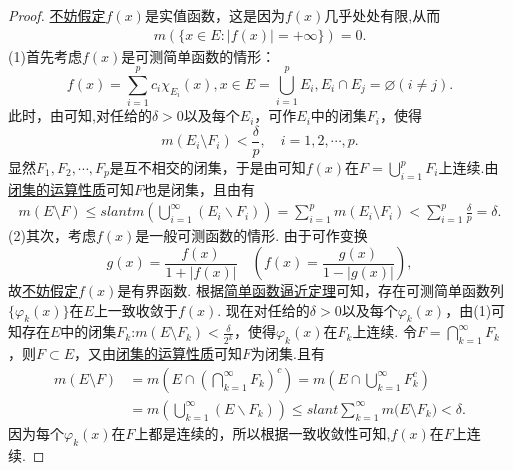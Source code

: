 \documentclass[../../main.tex]{subfiles}
\begin{document}
\begin{proof}
\hyperlink{不妨假定f是实值函数的原因}{不妨假定}\(f(x)\)是实值函数，这是因为$f(x)$几乎处处有限,从而
\begin{align*}
m(\{x \in E: |f(x)| = +\infty\}) = 0.
\end{align*}
(1)首先考虑\(f(x)\)是可测简单函数的情形：
\[f(x) = \sum_{i = 1}^{p} c_{i} \chi_{E_{i}}(x), x \in E = \bigcup_{i = 1}^{p} E_{i}, E_{i} \cap E_{j} = \varnothing (i \neq j).\]
此时，由可知,对任给的\(\delta > 0\)以及每个\(E_{i}\)，可作\(E_{i}\)中的闭集\(F_{i}\)，使得
\[m(E_{i} \setminus F_{i}) < \frac{\delta}{p}, \quad i = 1,2,\cdots,p.\]
显然\(F_{1},F_{2},\cdots,F_{p}\)是互不相交的闭集，于是由可知\(f(x)\)在\(F = \bigcup_{i = 1}^{p} F_{i}\)上连续.由\hyperref[theorem:闭集的运算性质]{闭集的运算性质}可知\(F\)也是闭集，且由有
\begin{align*}
m(E \setminus F) \leqslant slant m(\bigcup_{i=1}^{\infty}(E_i\backslash F_i))=\sum_{i = 1}^{p} m(E_{i} \setminus F_{i}) < \sum_{i = 1}^{p} \frac{\delta}{p} = \delta.
\end{align*}
(2)其次，考虑\(f(x)\)是一般可测函数的情形. 由于可作变换
\[g(x) = \frac{f(x)}{1 + |f(x)|} \quad \left(f(x) = \frac{g(x)}{1 - |g(x)|}\right),\]
故\hyperlink{不妨设f有界的原因}{不妨假定}\(f(x)\)是有界函数. 根据\hyperref[theorem:简单函数逼近定理]{简单函数逼近定理}可知，存在可测简单函数列\(\{\varphi_{k}(x)\}\)在\(E\)上一致收敛于\(f(x)\). 现在对任给的\(\delta > 0\)以及每个\(\varphi_{k}(x)\)，由(1)可知存在\(E\)中的闭集\(F_{k}\):\(m(E \setminus F_{k}) < \frac{\delta}{2^{k}}\)，使得\(\varphi_{k}(x)\)在\(F_{k}\)上连续. 令\(F = \bigcap_{k = 1}^{\infty} F_{k}\)，则\(F \subset E\)，又由\hyperref[theorem:闭集的运算性质]{闭集的运算性质}可知$F$为闭集.且有
\begin{align*}
m(E\setminus F)&=m(E\cap \left( \bigcap_{k=1}^{\infty}{F_k} \right) ^c)=m(E\cap \bigcup_{k=1}^{\infty}{F_{k}^{c}})
\\
&=m(\bigcup_{k=1}^{\infty}{\left( E\backslash F_k \right)})\leqslant slant \sum_{k=1}^{\infty}{m(E}\setminus F_k)<\delta .
\end{align*}
因为每个\(\varphi_{k}(x)\)在\(F\)上都是连续的，所以根据一致收敛性可知,\(f(x)\)在\(F\)上连续. 
\end{proof}
\end{document}
